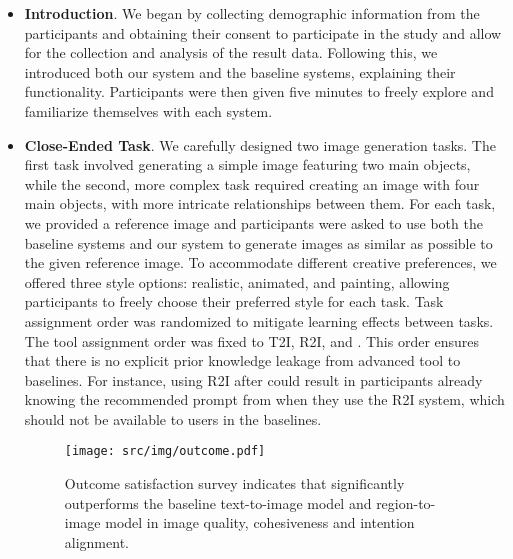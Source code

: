 \begin{itemize}
    \item \textbf{Introduction}.
    We began by collecting demographic information from the participants and obtaining their consent to participate in the study and allow for the collection and analysis of the result data. 
    Following this, we introduced both our system and the baseline systems, explaining their functionality. 
    Participants were then given five minutes to freely explore and familiarize themselves with each system.

    
    \item \textbf{Close-Ended Task}.
    We carefully designed two image generation tasks. 
    The first task involved generating a simple image featuring two main objects, while the second, more complex task required creating an image with four main objects, with more intricate relationships between them. 
    For each task, we provided a reference image and participants were asked to use both the baseline systems and our system to generate images as similar as possible to the given reference image.
    To accommodate different creative preferences, we offered three style options: realistic, animated, and painting, allowing participants to freely choose their preferred style for each task. 
    Task assignment order was randomized to mitigate learning effects between tasks.
    The tool assignment order was fixed to T2I, R2I, and \tool. 
    This order ensures that there is no explicit prior knowledge leakage from advanced tool to baselines. 
    For instance, using R2I after \tool could result in participants already knowing the recommended prompt from \tool when they use the R2I system, which should not be available to users in the baselines.


\begin{figure*}[t]
    \centering
    \texttt{[image: src/img/outcome.pdf]}
    \vspace{-2mm}
    \caption{Outcome satisfaction survey indicates that \tool significantly outperforms the baseline text-to-image model and region-to-image model in image quality, cohesiveness and intention alignment.}
    \label{fig:outcome}
    \vspace{-3mm}
\end{figure*}
    

\end{itemize}
